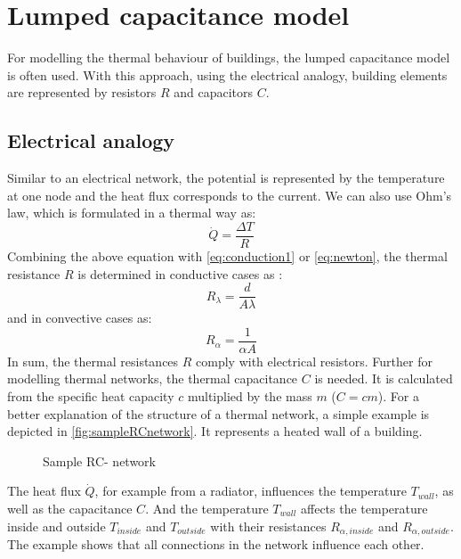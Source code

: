\section{Lumped capacitance model}
\label{section:modelling}
For modelling the thermal behaviour of buildings, the lumped capacitance model is often used. With this approach, using the electrical analogy, building elements are represented by resistors $R$ and capacitors $C$. \cite{Kramer.2012}

\subsection{Electrical analogy}
\label{electricalanalogy}

    Similar to an electrical network, the potential is represented by the temperature at one node and the heat flux corresponds to the current. We can also use Ohm's law, which is formulated in a thermal way as:  
     \begin{equation}
    \label{eq:Ohm}
        \dot{Q} = \frac{\Delta T}{R} 
    \end{equation}
    Combining the above equation with \autoref{eq:conduction1} or \autoref{eq:newton}, the thermal resistance $R$ is determined in conductive cases as \cite{Kuchling.2007}:
    \begin{equation}
    \label{eq:r_lambda}
        R_\lambda = \frac{d}{A\lambda}
    \end{equation}
   and in convective cases as\cite{Griesinger.2019}:
    \begin{equation}
        R_\alpha = \frac{1}{\alpha A}
    \end{equation}
    In sum, the thermal resistances $R$ comply with electrical resistors.
    Further for modelling thermal networks, the thermal capacitance $C$ is needed. It is calculated from the specific heat capacity $c$ multiplied by the mass $m$ ($C=cm$).
    \newline
    For a better explanation of the structure of a thermal network, a simple example is depicted in \autoref{fig:sampleRCnetwork}. It represents a heated wall of a building.
    \begin{figure}[h]
    \centering
    \def\svgwidth{300pt}
    
    \caption{Sample RC- network}
    \label{fig:sampleRCnetwork}
    \end{figure}
    The heat flux $\dot{Q}$, for example from a radiator, influences the temperature $T_{wall}$, as well as the capacitance $C$. And the temperature $T_{wall}$ affects the temperature inside and outside $T_{inside}$ and $T_{outside}$ with their resistances $R_{\alpha,inside}$ and $R_{\alpha,outside}$. The example shows that all connections in the network influence each other.

